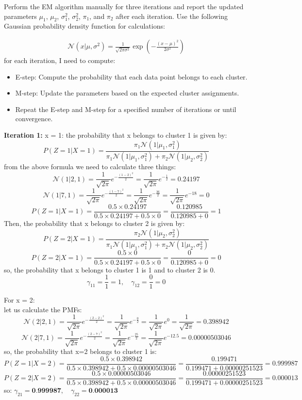 \documentclass{article}
\begin{document}
\begin{enumerate}
    Perform the EM algorithm manually for three iterations and report the updated parameters \(\mu_1\), \(\mu_2\), \(\sigma_1^2\), \(\sigma_2^2\), \(\pi_1\), and \(\pi_2\) after each iteration. Use the following Gaussian probability density function for calculations:
    
    \begin{align*}
    \mathcal{N}(x | \mu, \sigma^2) = \frac{1}{\sqrt{2 \pi \sigma^2}} \exp\left(-\frac{(x - \mu)^2}{2 \sigma^2}\right)
    \end{align*}
for each iteration, I need to compute:
    \begin{itemize}
        \item E-step: Compute the probability that each data point belongs to each cluster.
        \item M-step: Update the parameters based on the expected cluster assignments.
        \item Repeat the E-step and M-step for a specified number of iterations or until convergence.
    \end{itemize}

    \textbf{Iteration 1:}
x = 1:
the probability that x belongs to cluster 1 is given by:
\[
P(Z = 1 | X = 1) = \frac{\pi_1 \mathcal{N}(1 | \mu_1, \sigma_1^2)}{\pi_1 \mathcal{N}(1 | \mu_1, \sigma_1^2) + \pi_2 \mathcal{N}(1 | \mu_2, \sigma_2^2)}
\]
from the above formula we need to calculate three things:
\[
\mathcal{N}(1 | 2, 1) = \frac{1}{\sqrt{2\pi}} e^{-\frac{(1-2)^2}{2}} = \frac{1}{\sqrt{2\pi}} e^{-\frac{1}{2}} = 0.24197
\]
\[
\mathcal{N}(1 | 7, 1) = \frac{1}{\sqrt{2\pi}} e^{-\frac{(1-7)^2}{2}} = \frac{1}{\sqrt{2\pi}} e^{-\frac{36}{2}} = \frac{1}{\sqrt{2\pi}} e^{-18} = 0
\]
\[
P(Z = 1 | X = 1) = \frac{0.5 \times 0.24197}{0.5 \times 0.24197 + 0.5 \times 0} = \frac{0.120985}{0.120985 + 0} = 1
\]
Then, the probability that x belongs to cluster 2 is given by:
\[
P(Z = 2 | X = 1) = \frac{\pi_2 \mathcal{N}(1 | \mu_2, \sigma_2^2)}{\pi_1 \mathcal{N}(1 | \mu_1, \sigma_1^2) + \pi_2 \mathcal{N}(1 | \mu_2, \sigma_2^2)}
\]
\[
P(Z = 2 | X = 1) = \frac{0.5 \times 0}{0.5 \times 0.24197 + 0.5 \times 0} = \frac{0}{0.120985 + 0} = 0
\]
so, the probability that x belongs to cluster 1 is 1 and to cluster 2 is 0.
\[
\gamma_{11} = \frac{1}{1} = 1, \quad \gamma_{12} = \frac{0}{1} = 0
\]

For x = 2:
\\ let us calculate the PMFs:
\[
\mathcal{N}(2 | 2, 1) = \frac{1}{\sqrt{2\pi}} e^{-\frac{(2-2)^2}{2}} = \frac{1}{\sqrt{2\pi}} e^{-\frac{0}{2}} = \frac{1}{\sqrt{2\pi}} e^{0} = \frac{1}{\sqrt{2\pi}} = 0.398942
\]
\[
\mathcal{N}(2 | 7, 1) = \frac{1}{\sqrt{2\pi}} e^{-\frac{(2-7)^2}{2}} = \frac{1}{\sqrt{2\pi}} e^{-\frac{25}{2}} = \frac{1}{\sqrt{2\pi}} e^{-12.5} = 0.00000503046
\]
so, the probability that x=2 belongs to cluster 1 is:
\[
P(Z = 1 | X = 2) = \frac{0.5 \times 0.398942}{0.5 \times 0.398942 + 0.5 \times 0.00000503046} = \frac{0.199471}{0.199471 + 0.00000251523} = 0.999987
\]
\[
P(Z = 2 | X = 2) = \frac{0.5 \times 0.00000503046}{0.5 \times 0.398942 + 0.5 \times 0.00000503046} = \frac{0.00000251523}{0.199471 + 0.00000251523} = 0.000013
\]
so: $\gamma_{21} = \textbf{0.999987}, \quad \gamma_{22} = \textbf{0.000013}$


\end{enumerate}
\end{document}
